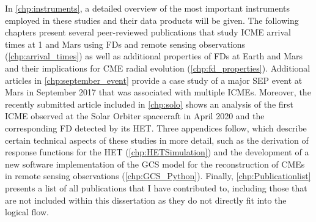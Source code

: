 In \autoref{chp:instruments}, a detailed overview of the most important instruments employed in these studies and their data products will be given. The following chapters present several peer-reviewed publications that study \ac{ICME} arrival times at \SI{1}{\AU} and Mars using \acp{FD} and remote sensing observations (\autoref{chp:arrival_times}) as well as additional properties of \acp{FD} at Earth and Mars and their implications for \ac{CME} radial evolution (\autoref{chp:fd_properties}). Additional articles in \autoref{chp:september_event} provide a case study of a major \ac{SEP} event at Mars in September 2017 that was associated with multiple \acp{ICME}. Moreover, the recently submitted article included in \autoref{chp:solo} shows an analysis of the first \ac{ICME} observed at the Solar Orbiter spacecraft in April 2020 and the corresponding \ac{FD} detected by its \ac{HET}. Three appendices follow, which describe certain technical aspects of these studies in more detail, such as the derivation of response functions for the \ac{HET} (\autoref{chp:HETSimulation}) and the development of a new software implementation of the \ac{GCS} model for the reconstruction of \acp{CME} in remote sensing observations (\autoref{chp:GCS_Python}). Finally, \autoref{chp:Publicationlist} presents a list of all publications that I have contributed to, including those that are not included within this dissertation as they do not directly fit into the logical flow.
